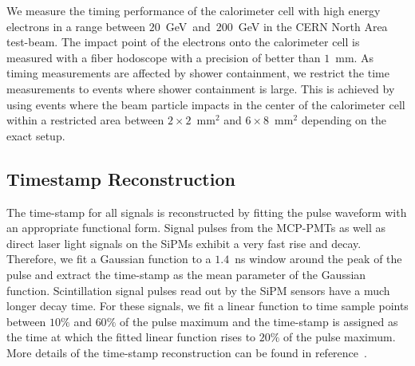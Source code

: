 We measure the timing performance of the calorimeter cell with high energy
electrons in a range between $20$~GeV~and~$200$~GeV in the CERN North Area
test-beam. The impact point of the electrons onto the calorimeter cell is
measured with a fiber hodoscope with a precision of better than $1$~mm. As
timing measurements are affected by shower containment, we restrict the time
measurements to events where shower containment is large. This is achieved by
using events where the beam particle impacts in the center of
the calorimeter cell within a restricted area between
$2\times2$~$\mathrm{mm}^{2}$ and $6\times8$~$\mathrm{mm}^{2}$ depending on the
exact setup. 

\subsection{Timestamp Reconstruction} \label{sec:reco} The time-stamp for all
signals is reconstructed by fitting the pulse waveform with an appropriate
functional form. Signal pulses from the MCP-PMTs as well as direct laser light
signals on the SiPMs exhibit a very fast rise and decay. Therefore, we fit a
Gaussian function to a $1.4$~ns window around the peak of the pulse and extract
the time-stamp as the mean parameter of the Gaussian function. Scintillation
signal pulses read out by the SiPM sensors have a much longer decay time. For
these signals, we fit a linear function to time sample points between $10\%$ and
$60\%$ of the pulse maximum and the time-stamp is assigned as the time at which
the fitted linear function rises to $20\%$ of the pulse maximum. More details of
the time-stamp reconstruction can be found in reference~\cite{Anderson:2015gha}.
